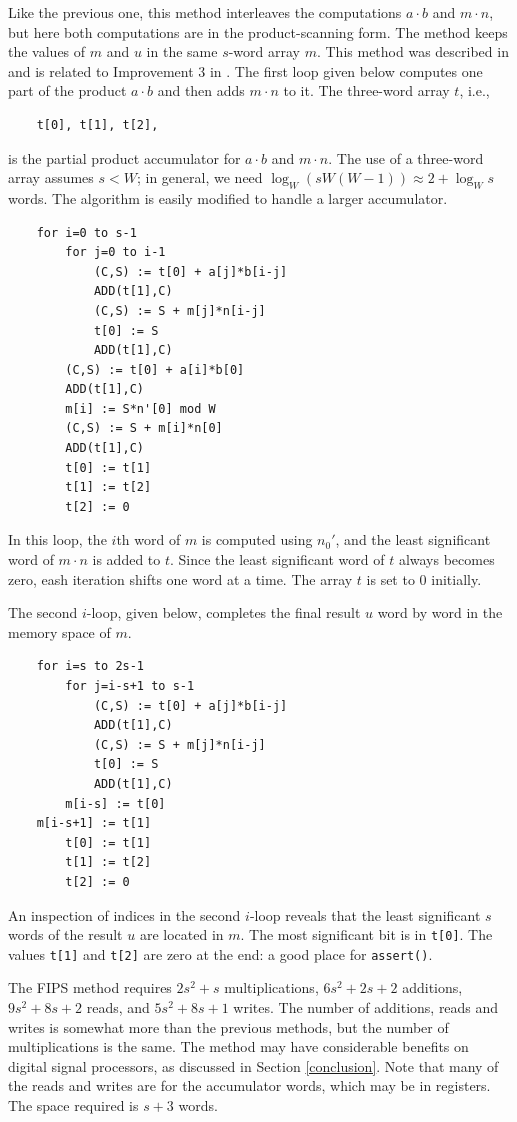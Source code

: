 \documentclass[twocolumn]{svjour3}          %
\begin{document}
Like the previous one, this method interleaves the computations
$a\cdot b$ and $m \cdot n$, but here both computations are in the
product-scanning form. The method keeps the values of $m$ and $u$ in
the same $s$-word array $m$.  This method was described in
\cite{K93:The} and is related to Improvement 3 in \cite{DK90:A}.  The
first loop given below computes one part of the product $a\cdot b$ and
then adds $m\cdot n$ to it.  The three-word array $t$, i.e.,
%
\begin{verbatim}
    t[0], t[1], t[2],
\end{verbatim}
%
is the partial product accumulator for  $a\cdot b$
and $m\cdot n$. The use of a three-word array assumes 
$s < W$; in general, we need $\log_W (sW(W-1)) \approx 2 + \log_W s$
words. The algorithm is easily modified to handle a larger
accumulator.
%
\begin{verbatim}
    for i=0 to s-1
        for j=0 to i-1
            (C,S) := t[0] + a[j]*b[i-j]
            ADD(t[1],C)
            (C,S) := S + m[j]*n[i-j]
            t[0] := S
            ADD(t[1],C)
        (C,S) := t[0] + a[i]*b[0]
        ADD(t[1],C)
        m[i] := S*n'[0] mod W
        (C,S) := S + m[i]*n[0]
        ADD(t[1],C)
        t[0] := t[1]
        t[1] := t[2]
        t[2] := 0
\end{verbatim}
%
In this loop, the $i$th word of $m$ is computed using $n_0'$, and the
least significant word of $m \cdot n$ is added to $t$. Since the least
significant word of $t$ always becomes zero, eash iteration shifts one
word at a time.  The array $t$ is set to 0 initially.

The second $i$-loop, given below, completes the final result $u$ word
by word in the memory space of $m$.
%
\begin{verbatim}
    for i=s to 2s-1
        for j=i-s+1 to s-1
            (C,S) := t[0] + a[j]*b[i-j]
            ADD(t[1],C)
            (C,S) := S + m[j]*n[i-j]
            t[0] := S
            ADD(t[1],C)
        m[i-s] := t[0]
	m[i-s+1] := t[1]
        t[0] := t[1]
        t[1] := t[2]
        t[2] := 0
\end{verbatim}
%
An inspection of indices in the second $i$-loop reveals that the least
significant $s$ words of the result $u$ are located in $m$. The most
significant bit is in \texttt{t[0]}. The values \texttt{t[1]} and
\texttt{t[2]} are zero at the end: a good place for \texttt{assert()}.

The FIPS method requires $2s^2+s$ multiplications, $6s^2+2s+2$
additions, $9s^2+8s+2$ reads, and $5s^2+8s+1$ writes. The number of
additions, reads and writes is somewhat more than the previous
methods, but the number of multiplications is the same.  The method
may have considerable benefits on digital signal processors, as
discussed in Section \ref{conclusion}. Note that many of the
reads and writes are for the accumulator words, which may be in
registers.  The space required is $s+3$ words.
\end{document}
